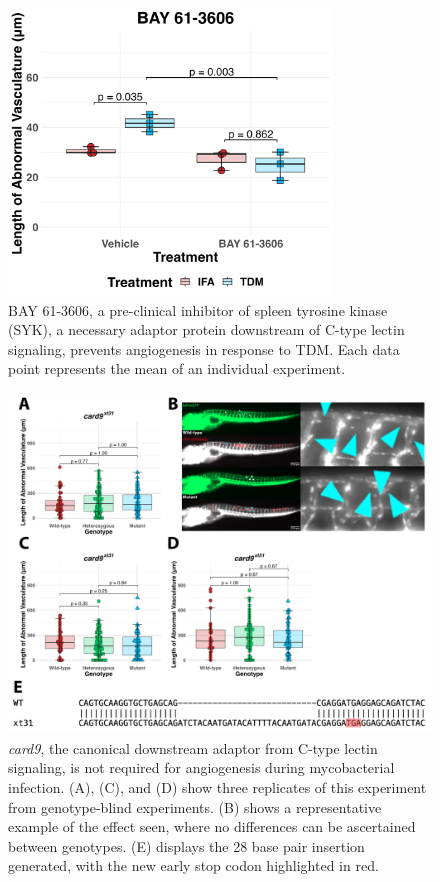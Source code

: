 \begin{figure}
\centering
\includegraphics[height=3in]{images/syk_tdm_120522.png}
\caption[Chemical inhibition of SYK prevents TDM-mediated Angiogenesis]{BAY 61-3606, a pre-clinical inhibitor of spleen tyrosine kinase (SYK), a necessary adaptor protein downstream of C-type lectin signaling, prevents angiogenesis in response to TDM. Each data point represents the mean of an individual experiment.}
\label{figure:syk}
\end{figure}

\begin{figure}
\centering
\includegraphics[width=\textwidth]{images/card9.pdf}
\caption[\textit{card9} is dispensable for angiogenesis]{\textit{card9}, the canonical downstream adaptor from C\hyp{}type lectin signaling, is not required for angiogenesis during mycobacterial infection. (A), (C), and (D) show three replicates of this experiment from genotype\hyp{}blind experiments. (B) shows a representative example of the effect seen, where no differences can be ascertained between genotypes. (E) displays the 28 base pair insertion generated, with the new early stop codon highlighted in red.}
\label{figure:card9}
\end{figure}

